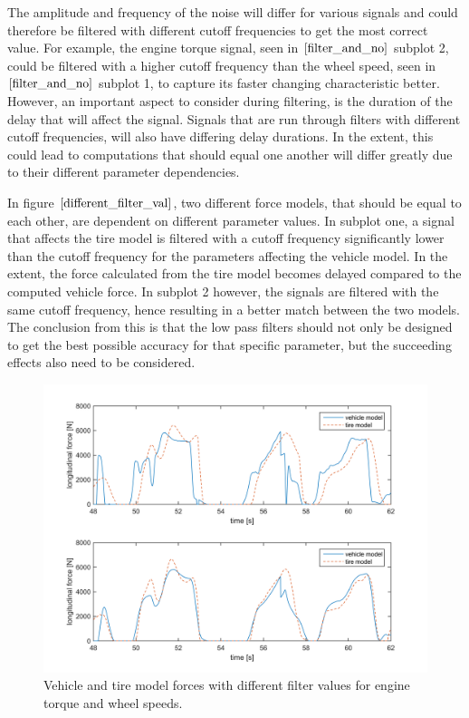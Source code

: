 The amplitude and frequency of the noise will differ for various signals and could therefore be filtered with different cutoff frequencies to get the most correct value. For example, the engine torque signal, seen in $ \ref{filter_and_no} $ subplot 2, could be filtered with a higher cutoff frequency than the wheel speed, seen in $ \ref{filter_and_no} $ subplot 1, to capture its faster changing characteristic better. However, an important aspect to consider during filtering, is the duration of the delay that will affect the signal. Signals that are run through filters with different cutoff frequencies, will also have differing delay durations. In the extent, this could lead to computations that should equal one another will differ greatly due to their different parameter dependencies. 

In figure $ \ref{different_filter_val} $, two different force models, that should be equal to each other, are dependent on different parameter values. In subplot one, a signal that affects the tire model is filtered with a cutoff frequency significantly lower than the cutoff frequency for the parameters affecting the vehicle model. In the extent, the force calculated from the tire model becomes delayed compared to the computed vehicle force. In subplot 2 however, the signals are filtered with the same cutoff frequency, hence resulting in a better match between the two models. The conclusion from this is that the low pass filters should not only be designed to get the best possible accuracy for that specific parameter, but the succeeding effects also need to be considered.

\begin{figure}[h]
	\centering
	\includegraphics[width=1.0\textwidth]{Pictures/different_filter_val}
	\caption {Vehicle and tire model forces with different filter values for engine torque and wheel speeds.}
	\label{different_filter_val}
\end{figure}

